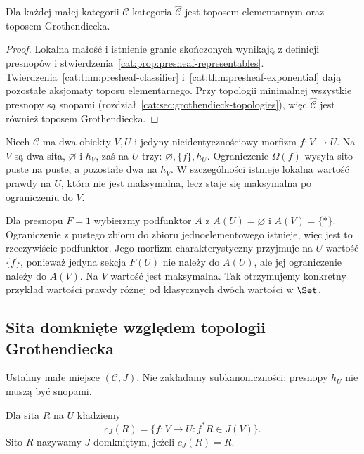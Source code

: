 \begin{wniosek}\label{cat:cor:presheaf-topos}
Dla każdej małej kategorii $\mathcal C$ kategoria $\widehat{\mathcal C}$ jest toposem elementarnym oraz toposem Grothendiecka.
\end{wniosek}
\begin{proof}
Lokalna małość i istnienie granic skończonych wynikają z definicji presnopów i stwierdzenia~\ref{cat:prop:presheaf-representables}. Twierdzenia~\ref{cat:thm:presheaf-classifier} i~\ref{cat:thm:presheaf-exponential} dają pozostałe aksjomaty toposu elementarnego. Przy topologii minimalnej wszystkie presnopy są snopami (rozdział~\ref{cat:sec:grothendieck-topologies}), więc $\widehat{\mathcal C}$ jest również toposem Grothendiecka.
\end{proof}

\begin{przyklad}\label{cat:ex:presheaf-truth-values}
Niech $\mathcal C$ ma dwa obiekty $V,U$ i jedyny nieidentycznościowy morfizm $f:V\to U$. Na $V$ są dwa sita, $\varnothing$ i $h_V$, zaś na $U$ trzy: $\varnothing,\{f\},h_U$. Ograniczenie $\Omega(f)$ wysyła sito puste na puste, a pozostałe dwa na $h_V$. W szczególności istnieje lokalna wartość prawdy na $U$, która nie jest maksymalna, lecz staje się maksymalna po ograniczeniu do $V$.

Dla presnopu $F=1$ wybierzmy podfunktor $A$ z $A(U)=\varnothing$ i $A(V)=\{*\}$. Ograniczenie z pustego zbioru do zbioru jednoelementowego istnieje, więc jest to rzeczywiście podfunktor. Jego morfizm charakterystyczny przyjmuje na $U$ wartość $\{f\}$, ponieważ jedyna sekcja $F(U)$ nie należy do $A(U)$, ale jej ograniczenie należy do $A(V)$. Na $V$ wartość jest maksymalna. Tak otrzymujemy konkretny przykład wartości prawdy różnej od klasycznych dwóch wartości w $\Set$.
\end{przyklad}


\subsection{Sita domknięte względem topologii Grothendiecka}

Ustalmy małe miejsce $(\mathcal C,J)$. Nie zakładamy subkanoniczności: presnopy $h_U$ nie muszą być snopami.

\begin{definicja}\label{cat:def:j-closed-sieve}
Dla sita $R$ na $U$ kładziemy
\[
 c_J(R)=\{f:V\to U:f^*R\in J(V)\}.
\]
Sito $R$ nazywamy $J$-domkniętym, jeżeli $c_J(R)=R$.
\end{definicja}

